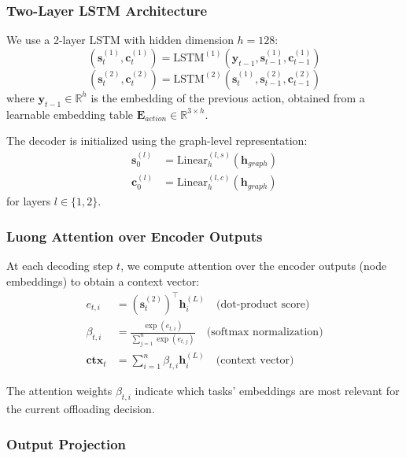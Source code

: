 \documentclass[journal,twoside]{IEEEtran}
\newcommand{\R}{\mathbb{R}}
\begin{document}
\subsubsection{Two-Layer LSTM Architecture}

We use a 2-layer LSTM with hidden dimension $h = 128$:
\begin{equation}
(\mathbf{s}_t^{(1)}, \mathbf{c}_t^{(1)}) = \text{LSTM}^{(1)}(\mathbf{y}_{t-1}, \mathbf{s}_{t-1}^{(1)}, \mathbf{c}_{t-1}^{(1)})
\end{equation}
\begin{equation}
(\mathbf{s}_t^{(2)}, \mathbf{c}_t^{(2)}) = \text{LSTM}^{(2)}(\mathbf{s}_t^{(1)}, \mathbf{s}_{t-1}^{(2)}, \mathbf{c}_{t-1}^{(2)})
\end{equation}
where $\mathbf{y}_{t-1} \in \R^h$ is the embedding of the previous action, obtained from a learnable embedding table $\mathbf{E}_{action} \in \R^{3 \times h}$.

The decoder is initialized using the graph-level representation:
\begin{align}
\mathbf{s}_0^{(l)} &= \text{Linear}_{h}^{(l,s)}(\mathbf{h}_{graph}) \\
\mathbf{c}_0^{(l)} &= \text{Linear}_{h}^{(l,c)}(\mathbf{h}_{graph})
\end{align}
for layers $l \in \{1, 2\}$.

\subsubsection{Luong Attention over Encoder Outputs}

At each decoding step $t$, we compute attention over the encoder outputs (node embeddings) to obtain a context vector:
\begin{align}
e_{t,i} &= (\mathbf{s}_t^{(2)})^\top \mathbf{h}_i^{(L)} \quad \text{(dot-product score)} \label{eq:luong_score}\\
\beta_{t,i} &= \frac{\exp(e_{t,i})}{\sum_{j=1}^{n} \exp(e_{t,j})} \quad \text{(softmax normalization)} \label{eq:luong_weight}\\
\mathbf{ctx}_t &= \sum_{i=1}^{n} \beta_{t,i} \mathbf{h}_i^{(L)} \quad \text{(context vector)} \label{eq:luong_ctx}
\end{align}

The attention weights $\beta_{t,i}$ indicate which tasks' embeddings are most relevant for the current offloading decision.

\subsubsection{Output Projection}
\end{document}
